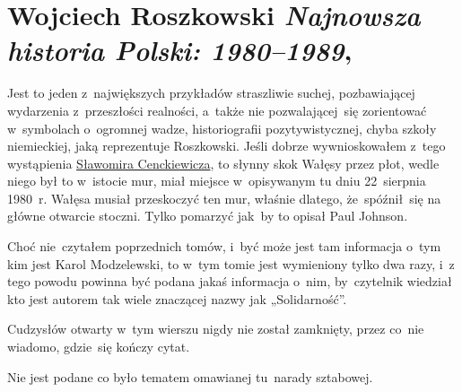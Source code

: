 \documentclass[a4paper,11pt]{article}
\numberwithin{equation}{section}
\begin{document}
\VerSpaceTwo






\section{Wojciech Roszkowski \textit{Najnowsza historia
    Polski: 1980--1989},
  \cite{RoszkowskiNajnowszaHistoriaPolski1980-1989Wyd2011} }




 Jest to jeden z~największych przykładów straszliwie
suchej, pozbawiającej wydarzenia z~przeszłości realności, a~także nie
pozwalającej~się zorientować w~symbolach o~ogromnej wadze,
historiografii pozytywistycznej, chyba szkoły niemieckiej, jaką
reprezentuje Roszkowski. Jeśli dobrze wywnioskowałem z~tego
wystąpienia
\href{https://www.youtube.com/watch?v=6B93_3CCMac}{Sławomira
  Cenckiewicza}, to słynny skok Wałęsy przez płot, wedle niego był to
w~istocie mur, miał miejsce w~opisywanym tu dniu 22~sierpnia 1980~r.
Wałęsa musiał przeskoczyć ten mur, właśnie dlatego, że~spóźnił~się na
główne otwarcie stoczni. Tylko pomarzyć jak~by to opisał Paul Johnson.

\VerSpaceFour





 Choć nie~czytałem poprzednich tomów, i~być może jest
tam informacja o~tym kim jest Karol Modzelewski, to w~tym tomie jest
wymieniony tylko dwa razy, i~z tego powodu powinna być podana jakaś
informacja o~nim, by~czytelnik wiedział kto jest autorem tak wiele
znaczącej nazwy jak „Solidarność”.

\VerSpaceFour





 Cudzysłów otwarty w~tym wierszu nigdy nie został
zamknięty, przez co~nie wiadomo, gdzie~się kończy cytat.

\VerSpaceFour





 Nie jest podane co było tematem omawianej
tu~narady sztabowej.


\end{document}
